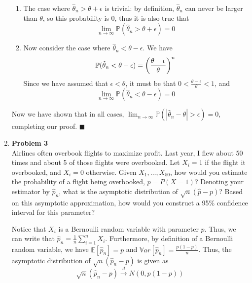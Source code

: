 \documentclass{article}
\newcommand{\gap}{\vspace{1 em}}
\begin{document}
\begin{enumerate}
\begin{solution}
{        \begin{enumerate}
            \item The case where $\hat{\theta}_n > \theta + \epsilon$ is trivial: by definition, $\hat{\theta}_n$ can never be larger than $\theta$, so this probability is 0, thus it is also true that 
            \[ \lim_{n \to \infty} \mathbb{P}(\hat{\theta}_n > \theta + \epsilon) = 0 \]
            \item Now consider the case where $\hat{\theta}_n < \theta - \epsilon$. We have
                \[
                    \mathbb{P}(\hat{\theta}_n < \theta -  \epsilon) = \left(\frac{\theta - \epsilon}{\theta}\right)^n \\
                \]
                Since we have assumed that $\epsilon < \theta$, it must be that $0 < \frac{\theta - \epsilon}{\theta} <1$, and
                \[ \lim_{n \to \infty} \mathbb{P}(\hat{\theta}_n < \theta - \epsilon) = 0 \]            
        \end{enumerate}
        Now we have shown that in all cases, $\lim_{n \to \infty} \mathbb{P}(|\hat{\theta}_n - \theta | > \epsilon) = 0$, completing our proof.
        \newline 
        $\blacksquare$
    }
    \end{solution}

    \item \textbf{Problem 3} \\
    Airlines often overbook flights to maximize profit. Last year, I flew about 50 times and about 5 of those flights 
    were overbooked. Let $X_i = 1$ if the flight it overbooked, and $X_i = 0$ otherwise. Given $X_1, \dots, X_{50}$, how 
    would you estimate the probability of a flight being overbooked, $p = P(X = 1)$? 
    Denoting your estimator by $\hat{p}_n$, what is the asymptotic distribution of $\sqrt{n}(\hat{p}-p)$? 
    Based on this asymptotic approximation, how would you construct a 95\% 
    confidence interval for this parameter?
    \begin{solution}
        {
            Notice that $X_i$ is a Bernoulli random variable with parameter $p$. Thus, we can write that $\hat{p}_n = \frac{1}{n} \sum_{i=1}^n X_i$. Furthermore, by definition of a Bernoulli random variable, we have $\mathbb{E}[\hat{p}_n] = p$ and $\mathbb{V}ar[\hat{p}_n] = \frac{p(1-p)}{n}$. Thus, the asymptotic distribution of $\sqrt{n}(\hat{p}_n - p)$ is given as
            \[
            \sqrt{n}(\hat{p}_n - p) \xrightarrow[]{d} N(0, p(1-p))
            \]
            \gap

}
\end{solution}
\end{enumerate}
\end{document}

